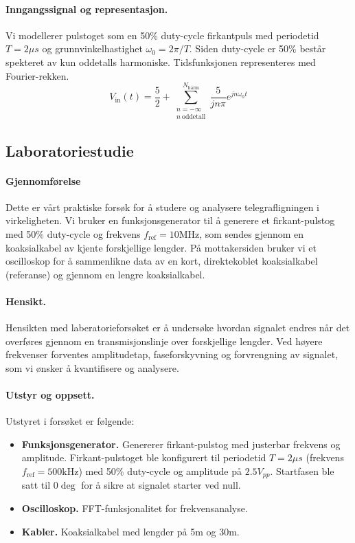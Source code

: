 \paragraph{Inngangssignal og representasjon.}
Vi modellerer pulstoget som en 50\% duty-cycle firkantpuls med periodetid $T = 2 \mu s$ og grunnvinkelhastighet $\omega_0 = 2\pi / T$. Siden duty-cycle er 50\% består spekteret av kun oddetalls harmoniske. Tidsfunksjonen representeres med Fourier-rekken.
\begin{equation}
    V_{\mathrm{in}}(t) = \frac{5}{2} + \sum_{\substack{n=-\infty\\ n\ \text{oddetall}}}^{N_{\mathrm{harm}}}\frac{5}{jn\pi} e^{jn\omega_0 t}
\end{equation} 


\clearpage
\subsection{Laboratoriestudie}
\paragraph{Gjennomførelse}
Dette er vårt praktiske forsøk for å studere og analysere telegrafligningen i virkeligheten. Vi bruker en funksjonsgenerator til å generere et firkant-pulstog med 50\% duty-cycle og frekvens $f_\mathrm{ref} = 10 \mathrm{MHz}$, som sendes gjennom en koaksialkabel av kjente forskjellige lengder. På mottakersiden bruker vi et oscilloskop for å sammenlikne data av en kort, direktekoblet koaksialkabel (referanse) og gjennom en lengre koaksialkabel.

\paragraph{Hensikt.} Hensikten med laberatorieforsøket er å undersøke hvordan signalet endres når det overføres gjennom en transmisjonslinje over forskjellige lengder. Ved høyere frekvenser forventes amplitudetap, faseforskyvning og forvrengning av signalet, som vi ønsker å kvantifisere og analysere.

\paragraph{Utstyr og oppsett.}
Utstyret i forsøket er følgende:
\begin{itemize}
    \item \textbf{Funksjonsgenerator.} Genererer firkant-pulstog med justerbar frekvens og amplitude. Firkant-pulstoget ble konfigurert til periodetid $T = 2 \mu s$ (frekvens $f_\mathrm{ref} = 500 \mathrm{kHz}$) med 50\% duty-cycle og amplitude på $2.5V_{pp}$. Startfasen ble satt til $0\deg$ for å sikre at signalet starter ved null.
    \item \textbf{Oscilloskop.} FFT-funksjonalitet for frekvensanalyse.
    \item \textbf{Kabler.} Koaksialkabel med lengder på 5m og 30m.
\end{itemize}

